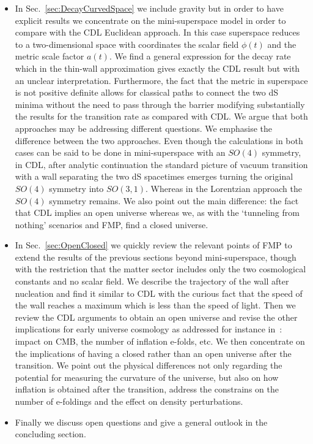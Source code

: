 \documentclass[a4paper,11pt]{article}
\numberwithin{equation}{section}
\begin{document}
\begin{itemize}
\item In Sec.~\ref{sec:DecayCurvedSpace} we include gravity but in order to have explicit results we concentrate  on the mini-superspace model in order to compare with the CDL Euclidean approach.  In this case superspace reduces to a two-dimensional space with coordinates the scalar field $\phi(t)$ and the metric scale factor $a(t)$. We find a general expression for the decay rate which in the thin-wall approximation  gives exactly the CDL result but with an unclear interpretation. Furthermore, the fact that the metric in superspace is not positive definite allows for classical paths to connect the two dS minima without the need to pass through the barrier modifying substantially the results for the transition rate as compared with CDL. We argue that both approaches may be addressing different questions.
We emphasise the difference between the two approaches. Even though the calculations in both cases can be said to be done in mini-superspace with an $SO(4)$ symmetry, in CDL, after analytic continuation the standard picture of vacuum transition with a wall separating the two dS spacetimes emerges turning the original $SO(4)$ symmetry into $SO(3,1)$. Whereas in the Lorentzian approach the $SO(4)$ symmetry remains. We also point out the main difference: the fact that CDL implies an open universe whereas we, as with the ‘tunneling from nothing’ scenarios and FMP, find a closed universe.

\item In Sec.~\ref{sec:OpenClosed} we quickly review the relevant points of FMP to extend the results of the previous sections beyond mini-superspace, though with the restriction that the matter sector includes only the two cosmological constants and no scalar field. We describe the trajectory of the wall after nucleation and find it similar to CDL with the curious fact that the speed of the wall reaches a maximum which is less than the speed of light. Then we review the CDL arguments to obtain an open universe and revise the other implications for early universe cosmology as addressed for instance in~\cite{Freivogel:2005vv}: impact on CMB, the number of inflation e-folds,  etc. We then concentrate on the implications of having a closed rather than an open universe after the transition. We point out the physical differences not only regarding the potential for measuring the curvature of the universe, but also on how inflation is obtained after the transition, address the constrains on the number of e-foldings and the effect on density perturbations. 

\item Finally we discuss open questions and give a general outlook in the concluding section.
\end{itemize}
\end{document}

